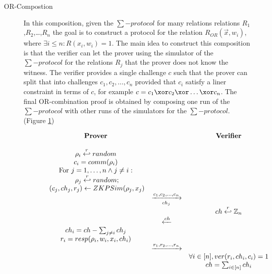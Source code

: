\begin{description}
\item[OR-Compostion] In this composition, given the $\sum-protocol$ for many relations 
  relations $R_{1}$,$R_{2}$,\dots,\(R_{n}\) the goal is to construct a protocol for the
  relation
  $R_{OR}(\vec{x}, w_{i}) $, where \(\exists i \leq n: R(x_{i},w_{i}) = 1\). The main idea to construct this composition is that the verifier
  can let the prover using the simulator of the \(\sum-protocol\) for the
  relations \(R_{j}\) that the prover does not know the witness.
  The verifier provides a single challenge \(c\)
  such that the prover can split that into challenges \(c_{1}, c_{2}, \dots, c_{n}\)
  provided that \(c_{i}\) satisfy a liner constraint in terms of \(c\),
  for example \(c = c_{1} \xor c_{2} \xor \dots \xor c_{n}\). The final OR-combination proof is
  obtained by composing one run of the \(\sum-protocol\) with other runs of the
  simulators for the \(\sum-protocol\). (Figure \ref{fig:OR-Combination})
  \begin{figure}[h!]
    \centering
    \begin{equation*}
      \begin{array}{c c c}
        \text{\textbf{Prover}} & & \text{\textbf{Verifier}} \\
        \\
        \rho_{i} \stackrel{r}{\hookleftarrow} random & & \\
        c_{i} = comm(\rho_{i}) & & \\
        \text{For } j = 1,\dots,n \wedge j \neq i: & & \\
        \text{    } \rho_{j} \stackrel{r}{\hookleftarrow} random; & & \\
        \text{    } (c_{j}, ch_{j}, r_{j}) \gets ZKPSim(\rho_{j}, x_{j}) & & \\
                               & \xrightarrow[ch_{j}]{c_{1}, c_{2}, \dots, c_{n}} & \\
                               & & ch \stackrel{r}{\hookleftarrow} \mathbb{Z}_{n} \\
                               & \xleftarrow{ch} & \\
        ch_{i} = ch - \sum_{j \neq i}{ch_{j}} & & \\
        r_{i} = resp(\rho_{i}, w_{i}, x_{i}, ch_{i}) & & \\
                               & \xrightarrow{r_{1}, r_{2}, \dots, r_{n}} & \\
                               & & \forall i \in [n], ver(r_{i}, ch_{i}, c_{i}) = 1 \\
                               & & ch = \sum_{i \in [n]}ch_{i}\\
      \end{array}
    \end{equation*}
    \caption{}
    \label{fig:OR-Combination}
  \end{figure}
\end{description}



